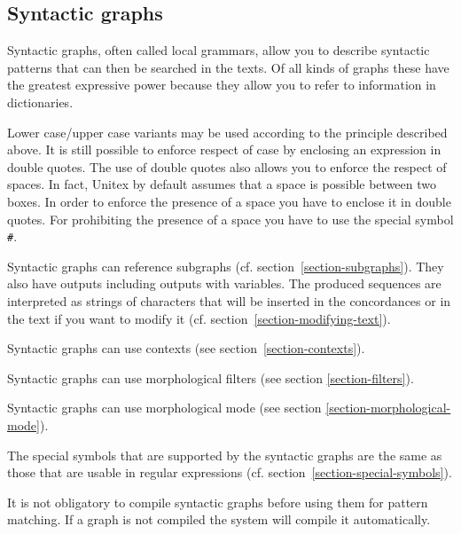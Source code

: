 \subsection{Syntactic graphs}
\label{syntactic-graphs}
Syntactic graphs, often called local grammars, allow you to describe syntactic
patterns that can then be searched in the texts. Of all kinds of graphs these
have the greatest expressive power because they allow you to refer to information
in dictionaries. 

\bigskip
\noindent Lower case/upper case variants may be used according to the principle described
above. It is still possible to enforce respect of case by enclosing an
expression in double quotes. The use of double quotes also allows you to enforce
the respect of spaces. In fact, Unitex by default assumes that a space is possible between two
boxes. In order to enforce the presence of a space you have to enclose it in
double quotes. For prohibiting the presence of a space you have to use the
special symbol \verb+#+.\index{\verbt{\#}}

\bigskip
\noindent Syntactic graphs can reference subgraphs (cf.
section~\ref{section-subgraphs}). They also have outputs including outputs
with variables. The produced sequences are interpreted as strings of characters
that will be inserted in the concordances or in the text if you want to modify it
(cf. section~\ref{section-modifying-text}).

\bigskip
\noindent Syntactic graphs can use contexts (see section~\ref{section-contexts}).

\bigskip
\noindent Syntactic graphs can use morphological filters (see section
\ref{section-filters}).

\bigskip
\noindent Syntactic graphs can use morphological mode (see section
\ref{section-morphological-mode}).

\bigskip
\noindent The special symbols that are supported by the syntactic graphs are the same as those that
are usable in regular expressions (cf.
section~\ref{section-special-symbols}).

\bigskip
\noindent It is not obligatory to compile syntactic graphs before using them for
pattern matching. If a graph is not compiled the system will compile it
automatically.

